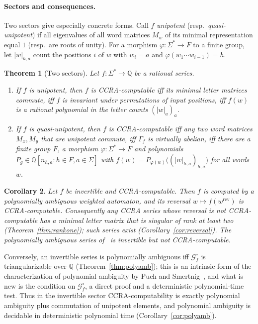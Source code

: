 \documentclass[11pt,letterpaper]{article}
\newcommand{\Q}{\mathbb{Q}}
\newcommand{\cG}{\mathcal{G}}
\newtheorem{theorem}{Theorem}
\newtheorem{corollary}[theorem]{Corollary}
\theoremstyle{definition}
\begin{document}
\paragraph{Sectors and consequences.}
Two sectors give especially concrete forms. Call $f$ \emph{unipotent} (resp.\ \emph{quasi-unipotent}) if all eigenvalues of all word matrices $M_w$ of its minimal representation equal $1$ (resp.\ are roots of unity). For a morphism $\varphi:\Sigma^*\to F$ to a finite group, let $|w|_{h,a}$ count the positions $i$ of $w$ with $w_i=a$ and $\varphi(w_1\cdots w_{i-1})=h$.

\begin{theorem}[Two sectors]\label{thm:sectors}
Let $f:\Sigma^*\to\Q$ be a rational series.
\begin{enumerate}[label=(\arabic*),leftmargin=2.2em]
\item If $f$ is unipotent, then $f$ is CCRA-computable iff its minimal letter matrices commute, iff $f$ is invariant under permutations of input positions, iff $f(w)$ is a rational polynomial in the letter counts $(|w|_a)_a$.
\item If $f$ is quasi-unipotent, then $f$ is CCRA-computable iff any two word matrices $M_x,M_y$ that are unipotent commute, iff $\Gamma_f$ is virtually abelian, iff there are a finite group $F$, a morphism $\varphi:\Sigma^*\to F$ and polynomials $P_g\in\Q[n_{h,a}:h\in F,a\in\Sigma]$ with $f(w)=P_{\varphi(w)}\bigl((|w|_{h,a})_{h,a}\bigr)$ for all words $w$.
\end{enumerate}
\end{theorem}

\begin{corollary}\label{cor:consequences}
Let $f$ be invertible and CCRA-computable. Then $f$ is computed by a polynomially ambiguous weighted automaton, and its reversal $w\mapsto f(w^{\mathrm{rev}})$ is CCRA-computable. Consequently any CCRA series whose reversal is not CCRA-computable has a minimal letter matrix that is singular of rank at least two (Theorem~\ref{thm:rankone}); such series exist (Corollary~\ref{cor:reversal}). The polynomially ambiguous series of~\cite[Example~17]{MPS26} is invertible but not CCRA-computable.
\end{corollary}

Conversely, an invertible series is polynomially ambiguous iff $\cG_f^\circ$ is triangularizable over $\Q$ (Theorem~\ref{thm:polyamb}); this is an intrinsic form of the characterization of polynomial ambiguity by Puch and Smertnig~\cite{PS24}, and what is new is the condition on $\cG_f^\circ$, a direct proof and a deterministic polynomial-time test. Thus in the invertible sector CCRA-computability is exactly polynomial ambiguity plus commutation of unipotent elements, and polynomial ambiguity is decidable in deterministic polynomial time (Corollary~\ref{cor:polyamb}).
\end{document}
